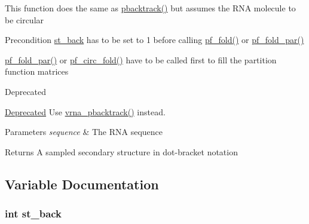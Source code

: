 This function does the same as \hyperlink{group__subopt__stochbt_gac03ca6db186bb3bf0a2a326d7fb3ba03}{pbacktrack()} but assumes the R\+N\+A molecule to be circular

\begin{DoxyPrecond}{Precondition}
\hyperlink{group__subopt__stochbt_gacd79b1a570e6ad9be24cb11fe8cae30a}{st\+\_\+back} has to be set to 1 before calling \hyperlink{group__pf__fold_gadc3db3d98742427e7001a7fd36ef28c2}{pf\+\_\+fold()} or \hyperlink{group__pf__fold_gac4f95bee734b2563a3d6e9932117ebdf}{pf\+\_\+fold\+\_\+par()} 

\hyperlink{group__pf__fold_gac4f95bee734b2563a3d6e9932117ebdf}{pf\+\_\+fold\+\_\+par()} or \hyperlink{group__pf__fold_ga819ce5fca8984004ac81c4a3b04cb735}{pf\+\_\+circ\+\_\+fold()} have to be called first to fill the partition function matrices
\end{DoxyPrecond}
\begin{DoxyRefDesc}{Deprecated}
\item[\hyperlink{deprecated__deprecated000096}{Deprecated}]Use \hyperlink{group__subopt__stochbt_ga0429de82e75af6c6e7508f4d273a192f}{vrna\+\_\+pbacktrack()} instead.\end{DoxyRefDesc}



\begin{DoxyParams}{Parameters}
{\em sequence} & The R\+N\+A sequence \\
\hline
\end{DoxyParams}
\begin{DoxyReturn}{Returns}
A sampled secondary structure in dot-\/bracket notation 
\end{DoxyReturn}


\subsection{Variable Documentation}
\hypertarget{group__subopt__stochbt_gacd79b1a570e6ad9be24cb11fe8cae30a}{
\subsubsection[{st\+\_\+back}]{\setlength{\rightskip}{0pt plus 5cm}int st\+\_\+back}}\label{group__subopt__stochbt_gacd79b1a570e6ad9be24cb11fe8cae30a}


